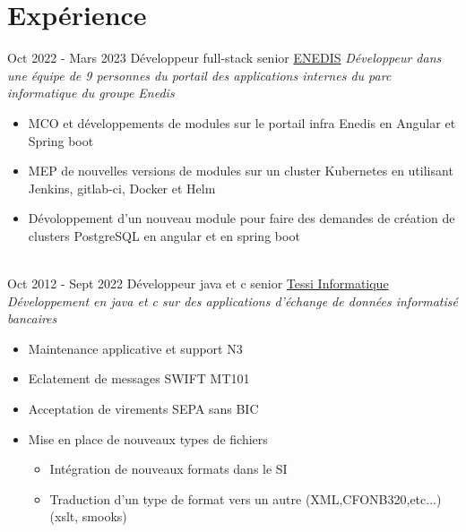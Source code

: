\documentclass[letterpaper]{twentysecondcv} %
\begin{document}
\makeprofile %
 

\section{Expérience}
\begin{twenty} %
    \twentyitem
   		{Oct 2022 -}
		{Mars 2023}
        {Développeur full-stack senior}
        {\href{https://www.enedis.fr}{ENEDIS}}
        {\textit{Développeur dans une équipe de 9 personnes du portail des applications internes du parc informatique du groupe Enedis}}
        {
       {\begin{itemize}
		\item MCO et développements de modules sur le portail infra Enedis en Angular et Spring boot
		\item MEP de nouvelles versions de modules sur un cluster Kubernetes en utilisant Jenkins, gitlab-ci, Docker et Helm  
                \item Dévoloppement d'un nouveau module pour faire des demandes de création de clusters PostgreSQL en angular et en spring boot
	 \end{itemize}}
        }
     \\
\twentyitem
    	{Oct 2012 -}
		{Sept 2022}
        {Développeur java et c senior}
        {\href{http://www.tessi.fr/}{Tessi Informatique}}
        {\textit{Développement en java et c sur des applications d’échange de données informatisé  bancaires}}
        {\begin{itemize}
        \item Maintenance applicative et support N3
        \item Eclatement de messages SWIFT MT101
        \item Acceptation de virements SEPA sans BIC
        \item Mise en place de nouveaux types de fichiers
      	{\begin{itemize}
		\item Intégration de nouveaux formats dans le SI
		\item Traduction d'un type de format vers un autre (XML,CFONB320,etc...) (xslt, smooks)

\end{itemize}}
\end{itemize}}
\end{twenty}
\end{document}
